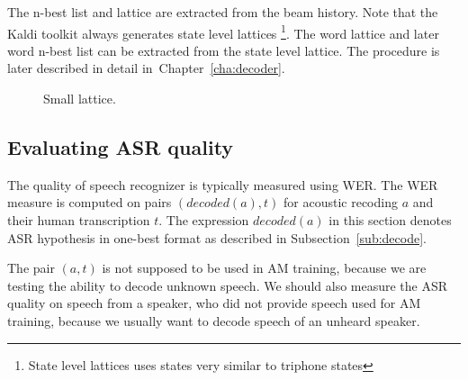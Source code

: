 {The n-best list and lattice are extracted from the beam history.
Note that the Kaldi toolkit always generates state level lattices
\footnote{State level lattices uses states very similar to triphone states}.\cite{povey2012generating} 
The word lattice and later word n-best list can be extracted 
from the state level lattice. 
The procedure is later described in detail in~Chapter~\ref{cha:decoder}.

\begin{figure}[!htp]
    \begin{center}
    
    \caption{Small lattice. }
    \label{fig:toy_lat} 
    \end{center}
\end{figure}


\subsection{Evaluating \ac{ASR} quality}
\label{sub:eval}
The quality of speech recognizer is typically measured using \acl{WER}.
The \ac{WER} measure is computed on pairs $(decoded(a),t)$ for acoustic recoding $a$ and their human transcription $t$.
The expression $decoded(a)$  in this section denotes \ac{ASR} hypothesis in one-best format 
as described in Subsection~\ref{sub:decode}.

The pair $(a,t)$ is not supposed to be used in \ac{AM} training,
because we are testing the ability to decode unknown speech.
We should also measure the \ac{ASR} quality on speech from a speaker,
who did not provide speech used for \ac{AM} training, 
because we usually want to decode speech of an unheard speaker.

}
